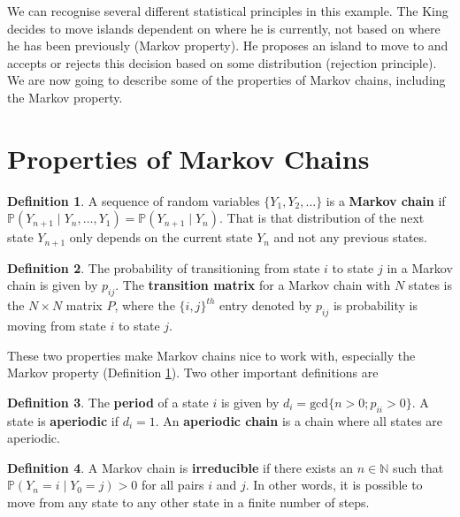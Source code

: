 \documentclass[
]{book}
\theoremstyle{definition}
\newtheorem{definition}{Definition}[chapter]
\theoremstyle{definition}
\theoremstyle{definition}
\theoremstyle{definition}
\theoremstyle{remark}
\begin{document}
We can recognise several different statistical principles in this example. The King decides to move islands dependent on where he is currently, not based on where he has been previously (Markov property). He proposes an island to move to and accepts or rejects this decision based on some distribution (rejection principle). We are now going to describe some of the properties of Markov chains, including the Markov property.

\hypertarget{properties-of-markov-chains}{%
\section{Properties of Markov Chains}\label{properties-of-markov-chains}}

\begin{definition}
\protect\hypertarget{def:Markov}{}\label{def:Markov}A sequence of random variables \(\{Y_1, Y_2, \ldots\}\) is a \textbf{Markov chain} if \(\mathbb{P}(Y_{n+1} \mid Y_{n}, \ldots, Y_1) = \mathbb{P}(Y_{n+1} \mid Y_{n})\). That is that distribution of the next state \(Y_{n+1}\) only depends on the current state \(Y_n\) and not any previous states.
\end{definition}

\begin{definition}
The probability of transitioning from state \(i\) to state \(j\) in a Markov chain is given by \(p_{ij}\). The \textbf{transition matrix} for a Markov chain with \(N\) states is the \(N \times N\) matrix \(P\), where the \(\{i, j\}^{th}\) entry denoted by \(p_{ij}\) is probability is moving from state \(i\) to state \(j\).
\end{definition}

These two properties make Markov chains nice to work with, especially the Markov property (Definition \ref{def:Markov}). Two other important definitions are

\begin{definition}
The \textbf{period }of a state \(i\) is given by \(d_i = \textrm{gcd}\{n > 0; p_{ii} > 0 \}\). A state is \textbf{aperiodic} if \(d_i = 1\). An \textbf{aperiodic chain} is a chain where all states are aperiodic.
\end{definition}

\begin{definition}
A Markov chain is \textbf{irreducible} if there exists an \(n \in \mathbb{N}\) such that \(\mathbb{P} (Y_n = i \mid Y_0 = j) > 0\) for all pairs \(i\) and \(j\). In other words, it is possible to move from any state to any other state in a finite number of steps.
\end{definition}
\end{document}
